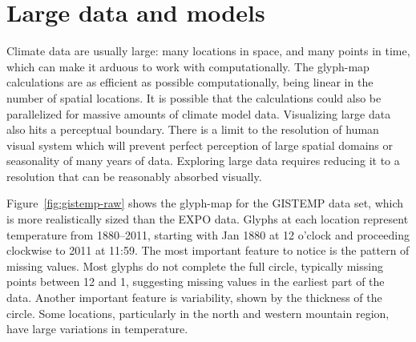 \documentclass[oneside]{article}
\begin{document}
\section{Large data and models}
\label{sec:large-data}

Climate data are usually large: many locations in space, and many points in time, which can make it arduous to work with computationally. The glyph-map calculations are as efficient as possible computationally, being linear in the number of spatial locations. It is possible that the calculations could also be parallelized for massive amounts of climate model data. Visualizing large data also hits a perceptual boundary.  There is a limit to the resolution of human visual system \citep{Kr12} which will prevent perfect perception of large spatial domains or seasonality of many years of data. Exploring large data requires reducing it to a resolution that can be reasonably absorbed visually.


Figure~\ref{fig:gistemp-raw} shows the glyph-map for the GISTEMP data set, which is more realistically sized than the EXPO data. Glyphs at each location represent temperature from 1880--2011, starting with Jan 1880 at 12 o'clock and proceeding clockwise to 2011 at 11:59. The most important feature to notice is the pattern of missing values. Most glyphs do not complete the full circle, typically missing points between 12 and 1, suggesting missing values in the earliest part of the data. Another important feature is variability, shown by the thickness of the circle. Some locations, particularly in the north and western mountain region, have large variations in temperature. 
\end{document}
